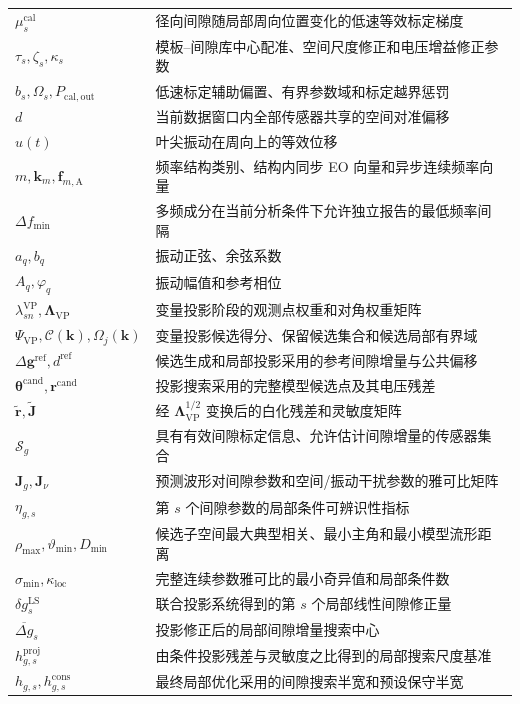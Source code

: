 \documentclass[UTF8,12pt,a4paper]{ctexart}
\begin{document}
\begin{longtable}{>{\centering\arraybackslash}p{}p{}}
$\mu_s^{\mathrm{cal}}$ & 径向间隙随局部周向位置变化的低速等效标定梯度\\
$\tau_s,\zeta_s,\kappa_s$ & 模板--间隙库中心配准、空间尺度修正和电压增益修正参数\\
$b_s,\Omega_s,P_{\mathrm{cal,out}}$ & 低速标定辅助偏置、有界参数域和标定越界惩罚\\
$d$ & 当前数据窗口内全部传感器共享的空间对准偏移\\
$u(t)$ & 叶尖振动在周向上的等效位移\\
$m,\bm k_m,\bm f_{m,\mathrm A}$ & 频率结构类别、结构内同步 EO 向量和异步连续频率向量\\
$\Delta f_{\min}$ & 多频成分在当前分析条件下允许独立报告的最低频率间隔\\
$a_q,b_q$ & 振动正弦、余弦系数\\
$A_q,\varphi_q$ & 振动幅值和参考相位\\
$\lambda_{sn}^{\mathrm{VP}},\bm\Lambda_{\mathrm{VP}}$ & 变量投影阶段的观测点权重和对角权重矩阵\\
$\Psi_{\mathrm{VP}},\mathcal C(\bm k),\Omega_j(\bm k)$ & 变量投影候选得分、保留候选集合和候选局部有界域\\
$\Delta\bm g^{\mathrm{ref}},d^{\mathrm{ref}}$ & 候选生成和局部投影采用的参考间隙增量与公共偏移\\
$\bm\theta^{\mathrm{cand}},\bm r^{\mathrm{cand}}$ & 投影搜索采用的完整模型候选点及其电压残差\\
$\widetilde{\bm r},\widetilde{\bm J}$ & 经 $\bm\Lambda_{\mathrm{VP}}^{1/2}$ 变换后的白化残差和灵敏度矩阵\\
$\mathcal S_g$ & 具有有效间隙标定信息、允许估计间隙增量的传感器集合\\
$\bm J_g,\bm J_{\nu}$ & 预测波形对间隙参数和空间/振动干扰参数的雅可比矩阵\\
$\eta_{g,s}$ & 第 $s$ 个间隙参数的局部条件可辨识性指标\\
$\rho_{\max},\vartheta_{\min},D_{\min}$ & 候选子空间最大典型相关、最小主角和最小模型流形距离\\
$\sigma_{\min},\kappa_{\mathrm{loc}}$ & 完整连续参数雅可比的最小奇异值和局部条件数\\
$\delta g_s^{\mathrm{LS}}$ & 联合投影系统得到的第 $s$ 个局部线性间隙修正量\\
$\overline{\Delta g}_s$ & 投影修正后的局部间隙增量搜索中心\\
$h_{g,s}^{\mathrm{proj}}$ & 由条件投影残差与灵敏度之比得到的局部搜索尺度基准\\
$h_{g,s},h_{g,s}^{\mathrm{cons}}$ & 最终局部优化采用的间隙搜索半宽和预设保守半宽\\
\bottomrule
\end{longtable}
\end{document}
